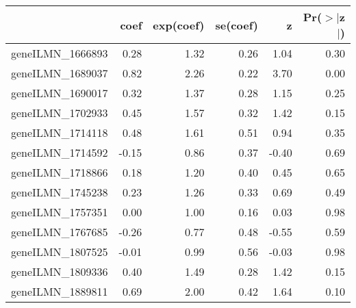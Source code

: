 \begin{table}[ht]
\centering
\begin{tabular}{rrrrrr}
  \hline
 & coef & exp(coef) & se(coef) & z & Pr($>$$|$z$|$) \\ 
  \hline
geneILMN\_1666893 & 0.28 & 1.32 & 0.26 & 1.04 & 0.30 \\ 
  geneILMN\_1689037 & 0.82 & 2.26 & 0.22 & 3.70 & 0.00 \\ 
  geneILMN\_1690017 & 0.32 & 1.37 & 0.28 & 1.15 & 0.25 \\ 
  geneILMN\_1702933 & 0.45 & 1.57 & 0.32 & 1.42 & 0.15 \\ 
  geneILMN\_1714118 & 0.48 & 1.61 & 0.51 & 0.94 & 0.35 \\ 
  geneILMN\_1714592 & -0.15 & 0.86 & 0.37 & -0.40 & 0.69 \\ 
  geneILMN\_1718866 & 0.18 & 1.20 & 0.40 & 0.45 & 0.65 \\ 
  geneILMN\_1745238 & 0.23 & 1.26 & 0.33 & 0.69 & 0.49 \\ 
  geneILMN\_1757351 & 0.00 & 1.00 & 0.16 & 0.03 & 0.98 \\ 
  geneILMN\_1767685 & -0.26 & 0.77 & 0.48 & -0.55 & 0.59 \\ 
  geneILMN\_1807525 & -0.01 & 0.99 & 0.56 & -0.03 & 0.98 \\ 
  geneILMN\_1809336 & 0.40 & 1.49 & 0.28 & 1.42 & 0.15 \\ 
  geneILMN\_1889811 & 0.69 & 2.00 & 0.42 & 1.64 & 0.10 \\ 
   \hline
\end{tabular}
\end{table}
